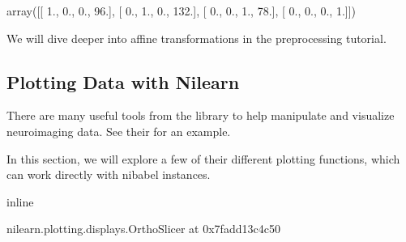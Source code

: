 \documentclass[letterpaper,10pt,english]{sphinxmanual}
\begin{document}
\begin{sphinxVerbatim}[commandchars=\\\{\}]
\end{sphinxVerbatim}

\begin{sphinxVerbatim}[commandchars=\\\{\}]
array([[   1.,    0.,    0.,  \PYGZhy{}96.],
       [   0.,    1.,    0., \PYGZhy{}132.],
       [   0.,    0.,    1.,  \PYGZhy{}78.],
       [   0.,    0.,    0.,    1.]])
\end{sphinxVerbatim}

We will dive deeper into affine transformations in the preprocessing tutorial.


\subsection{Plotting Data with Nilearn}
\label{\detokenize{content/Introduction_to_Neuroimaging_Data:plotting-data-with-nilearn}}
There are many useful tools from the  library to help manipulate and visualize neuroimaging data. See their  for an example.

In this section, we will explore a few of their different plotting functions, which can work directly with nibabel instances.

\begin{sphinxVerbatim}[commandchars=\\\{\}]
 inline

      
\end{sphinxVerbatim}

\begin{sphinxVerbatim}[commandchars=\\\{\}]
\end{sphinxVerbatim}

\begin{sphinxVerbatim}[commandchars=\\\{\}]
\PYGZlt{}nilearn.plotting.displays.OrthoSlicer at 0x7fadd13c4c50\PYGZgt{}
\end{sphinxVerbatim}
\end{document}
